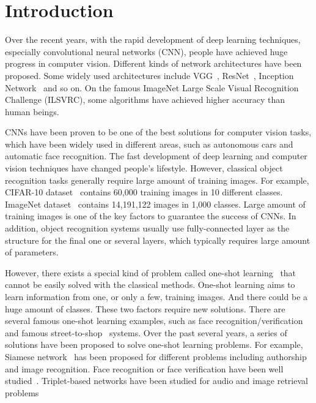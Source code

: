 \documentclass[final,3p]{elsarticle}
\begin{document}

\section{Introduction}
\label{S:introduction}

Over the recent years, with the rapid development of deep learning techniques, especially convolutional neural networks (CNN), people have achieved huge progress in computer vision. Different kinds of network architectures have been proposed. Some widely used architectures include VGG~\cite{simonyan2014very}, ResNet~\cite{he2016deep}, Inception Network~\cite{szegedy2016rethinking} and so on. On the famous ImageNet Large Scale Visual Recognition Challenge (ILSVRC), some algorithms have achieved higher accuracy than human beings. 

CNNs have been proven to be one of the best solutions for computer vision tasks, which have been widely used in different areas, such as autonomous cars and automatic face recognition. The fast development of deep learning and computer vision techniques have changed people's lifestyle. However, classical object recognition tasks generally require large amount of training images. For example, CIFAR-10 dataset~\cite{krizhevsky2009learning} contains 60,000 training images in 10 different classes. ImageNet dataset~\cite{imagenet_cvpr09} contains 14,191,122 images in 1,000 classes. Large amount of training images is one of the key factors to guarantee the success of CNNs. In addition, object recognition systems usually use fully-connected layer as the structure for the final one or several layers, which typically requires large amount of parameters. 

However, there exists a special kind of problem called one-shot learning~\cite{fei2006one} that cannot be easily solved with the classical methods. One-shot learning aims to learn information from one, or only a few, training images. And there could be a huge amount of classes. These two factors require new solutions. There are several famous one-shot learning examples, such as face recognition/verification and famous street-to-shop~\cite{liu2012street} systems. Over the past several years, a series of solutions have been proposed to solve one-shot learning problems. For example, Siamese network~\cite{koch2015siamese} has been proposed for different problems including authorship and image recognition. Face recognition or face verification have been well studied~\cite{schroff2015facenet, liu2015targeting}. Triplet-based networks have been studied for audio and image retrieval problems~\cite{wang2014learning, lin2015rapid, kiapour2015buy, wang2016matching, shankar2017deep, qi2017audio}
\end{document}
